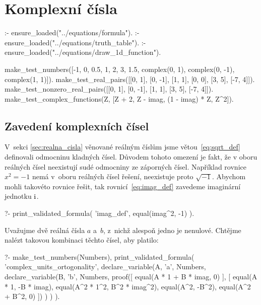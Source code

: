 \chapter{Komplexní čísla}


\begin{prolog}
:- ensure_loaded("../equations/formula").
:- ensure_loaded("../equations/truth_table").
:- ensure_loaded("../equations/draw_1d_function").

make_test_numbers([-1, 0, 0.5, 1, 2, 3, 1.5, complex(0, 1), complex(0, -1), complex(1, 1)]).
make_test_real_pairs([[0, 1], [0, -1], [1, 1], [0, 0], [3, 5], [-7, 4]]).
make_test_nonzero_real_pairs([[0, 1], [0, -1], [1, 1], [3, 5], [-7, 4]]).
make_test_complex_functions(Z, [Z + 2, Z - imag, (1 - imag) * Z, Z^2]).
\end{prolog}

\section{Zavedení komplexních čísel}

V~sekci \ref{sec:realna_cisla} věnované reálným číslům jsme větou~\eqref{eq:sqrt_def} definovali odmocninu kladných čísel. Důvodem tohoto omezení je fakt, že v oboru reálných čísel neexistují sudé odmocniny ze záporných čísel. Například rovnice \(x^2 = -1\) nemá v~oboru reálných čísel řešení, neexistuje proto \(\sqrt{-1}\). Abychom mohli takovéto rovnice řešit, tak rovnicí~\eqref{eq:imag_def} zavedeme imaginární jednotku \(\mathrm{i}\).

\begin{fact}
\begin{prolog}
?-	print_validated_formula(
		'imag_def',
		equal(imag^2, -1)
	).
\end{prolog}
\end{fact}

Uvažujme dvě reálná čísla \(a\) a~\(b\), z~nichž alespoň jedno je nenulové. Chtějme nalézt takovou kombinaci těchto čísel, aby platilo:

\begin{prolog}
?-	make_test_numbers(Numbers),
	print_validated_formula(
		'complex_units_ortogonality',
		declare_variable(A, 'a', Numbers,
			declare_variable(B, 'b', Numbers,
				proof([
					equal(A * 1 + B * imag, 0)
				],
				[
					equal(A * 1, -B * imag),
					equal(A^2 * 1^2, B^2 * imag^2),
					equal(A^2, -B^2),
					equal(A^2 + B^2, 0)
				])
			)
		)
	).
\end{prolog}

